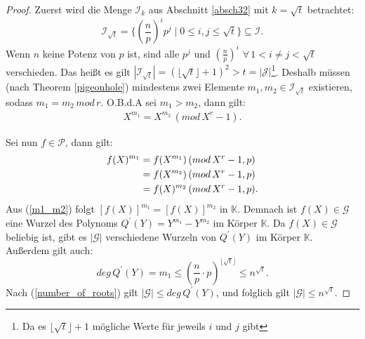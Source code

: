 \documentclass[12pt,oneside]{article}
\theoremstyle{remark}
\theoremstyle{definition}
\begin{document}
\begin{proof}
Zuerst wird die Menge $\mathcal{I}_k$ aus Abschnitt \ref{absch32} mit $k = \sqrt{t}$ betrachtet:
\begin{equation}
    \mathcal{I}_{\sqrt{t}} = \{ (\frac{n}{p})^i p^j \mid 0 \leq i,j \leq \sqrt{t}\} \subseteq \mathcal{I}.
\end{equation}
Wenn $n$ keine Potenz von $p$ ist, sind alle $p^j$ und $(\frac{n}{p})^i$ $\forall \, 1 <  i \neq j < \sqrt{t}$ verschieden. Das heißt es gilt $|\mathcal{I}_{\sqrt{t}}| = (\lfloor \sqrt{t} \rfloor + 1)^2 > t = |\mathcal{J}|$\footnote{ Da es $ \lfloor \sqrt{t} \rfloor + 1$  mögliche Werte für jeweils $i$ und $j$ gibt}. Deshalb müssen (nach Theorem \ref{pigeonhole}) mindestens zwei Elemente $m_1,m_2 \in \mathcal{I}_{\sqrt{t}}$ existieren, sodass $m_1 = m_2 \, mod \, r$. O.B.d.A sei $m_1 > m_2 $, dann gilt:\newline
\begin{align*}
    X^{m_1} = X^{m_2} \, (mod \, X^r - 1).
\end{align*}

Sei nun $ f \in \mathcal{P}$, dann gilt:\newline
\begin{equation}\label{m1_m2}
    \begin{aligned}
         f(X)^{m_1} &= f(X^{m_1}) \, (mod \, X^r - 1, p) \\
        &= f(X^{m_2}) \, (mod \, X^r - 1,p) \\
        &= f(X)^{m_2} \, (mod \, X^r - 1,p).\newline
    \end{aligned}
\end{equation}
Aus (\ref{m1_m2}) folgt $[f(X)]^{m_1} = [f(X)]^{m_2}$ in $\mathbb{K}$. Demnach ist $f(X) \in  \mathcal{G}$ eine Wurzel des Polynoms $Q^{'}(Y) = Y^{m_1} - Y^{m_2}$ im Körper $\mathbb{K}$. Da $f(X) \in \mathcal{G} $ beliebig ist, gibt es $|\mathcal{G}|$ verschiedene Wurzeln von $Q^{'}(Y)$ im Körper $\mathbb{K}$. Außerdem gilt auch:
\begin{equation}\label{degQ}
    deg \, Q^{'}(Y) = m_1 \leq (\frac{n}{p} \cdot p)^{\lfloor \sqrt{t} \rfloor} \leq n^{\sqrt{t}}. 
\end{equation}
Nach (\ref{number_of_roots}) gilt $|\mathcal{G}| \leq deg \, Q^{'}(Y)$, und folglich gilt $|\mathcal{G}| \leq n^{\sqrt{t}}$.\newline\newline
\end{proof}
\end{document}
